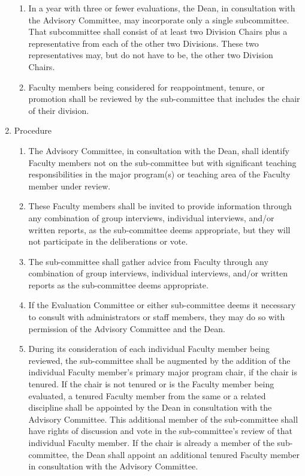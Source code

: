 \documentclass{manual}
\newcommand{\itemLevelA}{\alph*.}
\newcommand{\itemLevelB}{\arabic*)}
\newcommand{\itemRefA}{\alph*}
\newcommand{\itemRefB}{\arabic*}
\begin{document}
\begin{enumerate}[label=\itemLevelA,ref=\itemRefA]
\begin{enumerate}[label=\itemLevelB,ref=\itemRefB]
\item In a year with three or fewer evaluations, the Dean, in consultation with the Advisory Committee, may incorporate only a single subcommittee. That subcommittee shall consist of at least two Division Chairs plus a representative from each of the other two Divisions. These two representatives may, but do not have to be, the other two Division Chairs.

\item Faculty members being considered for reappointment, tenure, or promotion shall be reviewed by the sub-committee that includes the chair of their division.
\end{enumerate}

\item Procedure \label{item:procedure08}
\begin{enumerate}[label=\itemLevelB,ref=\itemRefB]

\item The Advisory Committee, in consultation with the Dean, shall identify Faculty members not on the sub-committee but with significant teaching responsibilities in the major program(s) or teaching area of the Faculty member under review.

\item These Faculty members shall be invited to provide information through any combination of group interviews, individual interviews, and/or written reports, as the sub-committee deems appropriate, but they will not participate in the deliberations or vote.

\item The sub-committee shall gather advice from Faculty through any combination of group interviews, individual interviews, and/or written reports as the sub-committee deems appropriate.

\item If the Evaluation Committee or either sub-committee deems it necessary to consult with administrators or staff members, they may do so with permission of the Advisory Committee and the Dean.

\item During its consideration of each individual Faculty member being reviewed, the sub-committee shall be augmented by the addition of the individual Faculty member's primary major program chair, if the chair is tenured. If the chair is not tenured or is the Faculty member being evaluated, a tenured Faculty member from the same or a related discipline shall be appointed by the Dean in consultation with the Advisory Committee. This additional member of the sub-committee shall have rights of discussion and vote in the sub-committee's review of that individual Faculty member. If the chair is already a member of the sub-committee, the Dean shall appoint an additional tenured Faculty member in consultation with the Advisory Committee.


\end{enumerate}
\end{enumerate}
\end{document}
